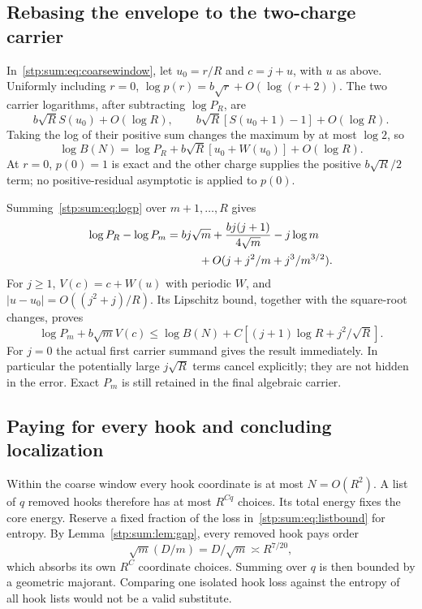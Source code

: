 \documentclass[11pt]{article}
\theoremstyle{remark}\newtheorem{remark}[theorem]{Remark}
\begin{document}
\subsection{Rebasing the envelope to the two-charge carrier}
In~\eqref{stp:sum:eq:coarsewindow}, let $u_0=r/R$ and $c=j+u$, with $u$ as above. Uniformly including $r=0$, $\log p(r)=b\sqrt r+O(\log(r+2))$. The two carrier logarithms, after subtracting $\log P_R$, are
\[
 b\sqrt R S(u_0)+O(\log R),\qquad
 b\sqrt R[S(u_0+1)-1]+O(\log R).
\]
Taking the log of their positive sum changes the maximum by at most $\log2$, so
\begin{equation}\label{stp:sum:eq:logBphase}
 \log B(N)=\log P_R+b\sqrt R[u_0+W(u_0)]+O(\log R).
\end{equation}
At $r=0$, $p(0)=1$ is exact and the other charge supplies the positive $b\sqrt R/2$ term; no positive-residual asymptotic is applied to $p(0)$.

Summing~\eqref{stp:sum:eq:logp} over $m+1,\ldots,R$ gives
\begin{align*}
 \log P_R-\log P_m
 &=bj\sqrt m+\frac{bj(j+1)}{4\sqrt m}-j\log m\\
 &\hspace{10mm}+O(j+j^2/m+j^3/m^{3/2}).
\end{align*}
For $j\ge1$, $V(c)=c+W(u)$ with periodic $W$, and $|u-u_0|=O((j^2+j)/R)$. Its Lipschitz bound, together with the square-root changes, proves
\begin{equation}\label{stp:sum:eq:rebase}
 \log P_m+b\sqrt mV(c)
 \le\log B(N)+C[(j+1)\log R+j^2/\sqrt R].
\end{equation}
For $j=0$ the actual first carrier summand gives the result immediately. In particular the potentially large $j\sqrt R$ terms cancel explicitly; they are not hidden in the error. Exact $P_m$ is still retained in the final algebraic carrier.

\subsection{Paying for every hook and concluding localization}
Within the coarse window every hook coordinate is at most $N=O(R^2)$. A list of $q$ removed hooks therefore has at most $R^{Cq}$ choices. Its total energy fixes the core energy. Reserve a fixed fraction of the loss in~\eqref{stp:sum:eq:listbound} for entropy. By Lemma~\ref{stp:sum:lem:gap}, every removed hook pays order
\[
 \sqrt m(D/m)=D/\sqrt m\asymp R^{7/20},
\]
which absorbs its own $R^C$ coordinate choices. Summing over $q$ is then bounded by a geometric majorant. Comparing one isolated hook loss against the entropy of all hook lists would not be a valid substitute.
\end{document}
